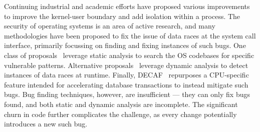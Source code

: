 Continuing industrial and academic efforts have proposed various 
improvements to improve the kernel-user boundary and add isolation within
a process.
The security of operating systems is an area of active research, and many
methodologies have been proposed to fix the issue of data races at the system
call interface, primarily focussing on finding and fixing instances of such
bugs.
One class of proposals~\cite{dftracker, deadline, dftinker} leverage static
analysis to search the OS codebases for specific vulnerable patterns.
Alternative proposals~\cite{schwartzDECAF,jurczyk2013bochspwn,wilhelm2016xenpwn}
leverage dynamic analysis to detect instances of data races at runtime.
Finally, DECAF~\cite{schwartzDECAF} repurposes a CPU-specific feature
intended for accelerating database transactions to instead mitigate such
bugs.
Bug finding techniques, however, are insufficient --- they can only fix
bugs found, and both static and dynamic analysis are incomplete.
The significant churn in code further complicates the challenge, as every
change potentially introduces a new such bug.

